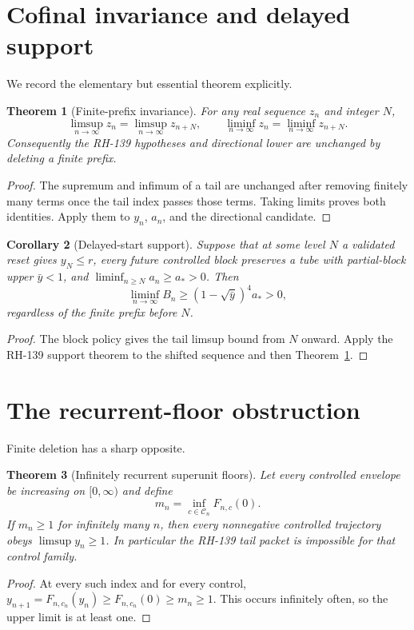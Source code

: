 \documentclass[12pt]{article}
\newtheorem{theorem}{Theorem}
\newtheorem{corollary}[theorem]{Corollary}
\begin{document}
\section{Cofinal invariance and delayed support}
We record the elementary but essential theorem explicitly.

\begin{theorem}[Finite-prefix invariance]\label{thm:prefix}
For any real sequence $z_n$ and integer $N$,
\[
 \limsup_{n\to\infty}z_n=\limsup_{n\to\infty}z_{n+N},
 \qquad
 \liminf_{n\to\infty}z_n=\liminf_{n\to\infty}z_{n+N}.
\]
Consequently the RH-139 hypotheses and directional lower are unchanged by
deleting a finite prefix.
\end{theorem}
\begin{proof}
The supremum and infimum of a tail are unchanged after removing finitely many
terms once the tail index passes those terms.  Taking limits proves both
identities.  Apply them to $y_n$, $a_n$, and the directional candidate.
\end{proof}

\begin{corollary}[Delayed-start support]\label{cor:start}
Suppose that at some level $N$ a validated reset gives $y_N\leq r$, every
future controlled block preserves a tube with partial-block upper
$\bar y<1$, and $\liminf_{n\geq N}a_n\geq a_*>0$.  Then
\[
 \liminf_{n\to\infty}B_n
 \geq(1-\sqrt{\bar y})^4a_*>0,
\]
regardless of the finite prefix before $N$.
\end{corollary}
\begin{proof}
The block policy gives the tail limsup bound from $N$ onward.  Apply the
RH-139 support theorem to the shifted sequence and then
Theorem~\ref{thm:prefix}.
\end{proof}

\section{The recurrent-floor obstruction}
Finite deletion has a sharp opposite.

\begin{theorem}[Infinitely recurrent superunit floors]\label{thm:recurrent}
Let every controlled envelope be increasing on $[0,\infty)$ and define
\[
 m_n=\inf_{c\in\mathcal C_n}F_{n,c}(0).
\]
If $m_n\geq1$ for infinitely many $n$, then every nonnegative controlled
trajectory obeys $\limsup y_n\geq1$.  In particular the RH-139 tail packet
is impossible for that control family.
\end{theorem}
\begin{proof}
At every such index and for every control,
$y_{n+1}=F_{n,c_n}(y_n)\geq F_{n,c_n}(0)\geq m_n\geq1$.
This occurs infinitely often, so the upper limit is at least one.
\end{proof}
\end{document}
